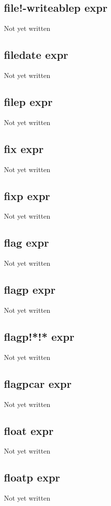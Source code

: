 \documentclass[a4paper,11pt]{article}
\begin{document}
{\subsection{\ttfamily file!-writeablep expr}
Not yet written

\subsection{\ttfamily filedate expr}
Not yet written

\subsection{\ttfamily filep expr}
Not yet written

\subsection{\ttfamily fix expr}
Not yet written

\subsection{\ttfamily fixp expr}
Not yet written

\subsection{\ttfamily flag expr}
Not yet written

\subsection{\ttfamily flagp expr}
Not yet written

\subsection{\ttfamily flagp!*!* expr}
Not yet written

\subsection{\ttfamily flagpcar expr}
Not yet written

\subsection{\ttfamily float expr}
Not yet written

\subsection{\ttfamily floatp expr}
Not yet written

}
\end{document}
